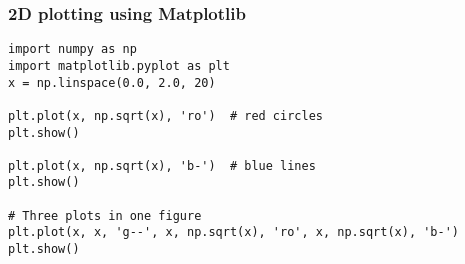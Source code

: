 \documentclass[10pt]{beamer}
\begin{document}
\begin{frame}[fragile]
\frametitle{2D plotting using Matplotlib}
\begin{verbatim}
import numpy as np
import matplotlib.pyplot as plt
x = np.linspace(0.0, 2.0, 20)

plt.plot(x, np.sqrt(x), 'ro')  # red circles
plt.show()

plt.plot(x, np.sqrt(x), 'b-')  # blue lines
plt.show()

# Three plots in one figure
plt.plot(x, x, 'g--', x, np.sqrt(x), 'ro', x, np.sqrt(x), 'b-')
plt.show()
\end{verbatim}
\end{frame}
\end{document}
